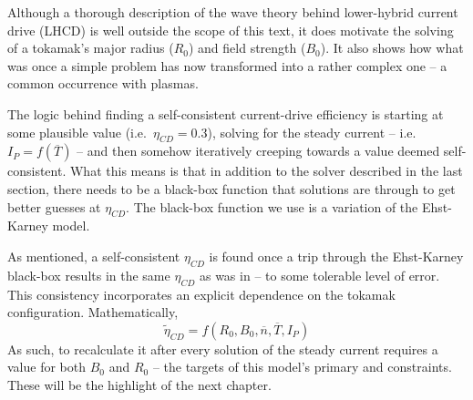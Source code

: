 Although a thorough description of the wave theory behind lower-hybrid current drive (LHCD) is well outside the scope of this text, it does motivate the solving of a tokamak's major radius ($R_0$) and field strength ($B_0$). It also shows how what was once a simple problem has now transformed into a rather complex one -- a common occurrence with plasmas.

The logic behind finding a self-consistent current-drive efficiency is starting at some plausible value (i.e.\ $\eta_{CD} = 0.3$), solving for the steady current -- i.e.\ $I_P = f(\overline T)$ -- and then somehow iteratively creeping towards a value deemed self-consistent. What this means is that in addition to the solver described in the last section, there needs to be a black-box function that solutions are  through to get better guesses at $\eta_{CD}$. The black-box function we use is a variation of the Ehst-Karney model. \cite{ehstkarney}

As mentioned, a self-consistent $\eta_{CD}$ is found once a trip through the Ehst-Karney black-box results in the same $\eta_{CD}$ as was  in -- to some tolerable level of error. This consistency incorporates an explicit dependence on the tokamak configuration. Mathematically,
\begin{equation}
	\tilde \eta_{CD} = f( R_0, B_0, \overline n, \overline T, I_P )
\end{equation}
As such, to recalculate it after every solution of the steady current requires a value for both $B_0$ and $R_0$ -- the targets of this model's primary and  constraints. These will be the highlight of the next chapter.

%
